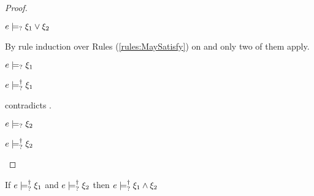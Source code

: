 \begin{proof}
\begin{byCases}
  \item[\text{(\ref{rule:CSMSMay})}]
    \begin{pfsteps*}
    \item $e \models_{?} \xi_1 \vee \xi_2$  
    \end{pfsteps*}
    By rule induction over Rules (\ref{rules:MaySatisfy}) on  and only two of them apply.
    \begin{byCases}

    \item[\text{(\ref{rule:CMSOr1})}]
      \begin{pfsteps*}
      \item $e \models_{?} \xi_1$  
      \item $e \models_{?}^{\dag} \xi_1$  
      \end{pfsteps*}
       contradicts .

    \item[\text{(\ref{rule:CMSOr2})}]
      \begin{pfsteps*}
      \item $e \models_{?} \xi_2$  
      \item $e \models_{?}^{\dag} \xi_2$ 
      \end{pfsteps*}
    \end{byCases}
    \resetpfcounter
  \end{byCases}
\end{proof}

\begin{lemma}
  \label{lem:satormay-and}
  If $e \models_{?}^{\dag} \xi_1$ and $e \models_{?}^{\dag} \xi_2$ then $e \models_{?}^{\dag} \xi_1 \wedge \xi_2$
\end{lemma}

